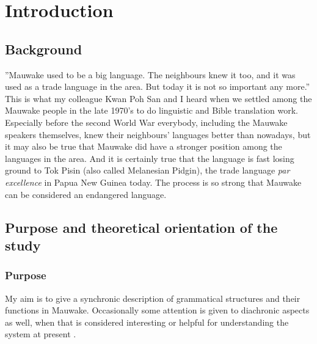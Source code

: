 
\chapter{Introduction}


\section{Background}

''Mauwake used to be a big language. The neighbours knew it too, and it was used as a trade language in the area. But today it is not so important any more.'' This is what my colleague Kwan Poh San and I heard when we settled among the Mauwake people in the late 1970's to do linguistic and Bible translation work. Especially before the second World War everybody, including the Mauwake speakers themselves, knew their neighbours' languages better than nowadays, but it may also be true that Mauwake did have a stronger position among the languages in the area. And it is certainly true that the language is fast losing ground to Tok Pisin (also called Melanesian Pidgin), the trade language \textit{par excellence} in Papua New Guinea today.  The process is so strong that Mauwake can be considered an endangered language.

\section{Purpose and theoretical orientation of the study}
\subsection{Purpose}
My aim is to give a synchronic description of grammatical structures and their functions in Mauwake. Occasionally some attention is given to diachronic aspects as well, when that is considered interesting or helpful for understanding the system at present \citep[20]{EvansEtAl2006}%
. 

